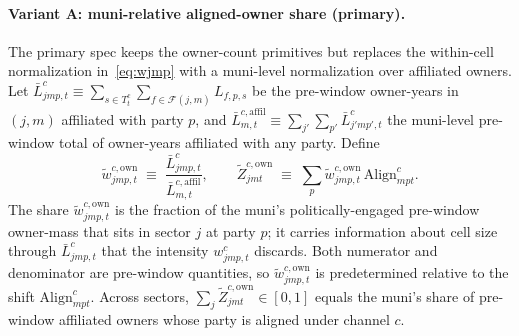 \documentclass{article}
\newcommand{\Align}{\mathrm{Align}}
\newcommand{\cF}{\mathcal{F}}
\theoremstyle{plain}
\theoremstyle{definition}
\theoremstyle{remark}
\begin{document}
\paragraph{Variant A: muni-relative aligned-owner share (primary).}
The primary spec keeps the owner-count primitives but replaces the
within-cell normalization in~\eqref{eq:wjmp} with a muni-level
normalization over affiliated owners. Let
\(
  \bar L^c_{jmp,t}\equiv\sum_{s\in T^{c}_t}
    \sum_{f\in\cF(j,m)} L_{f,p,s}
\)
be the pre-window owner-years in $(j,m)$ affiliated with party $p$, and
\(
  \bar L^{c,\mathrm{affil}}_{m,t}\equiv\sum_{j'}\sum_{p'}\bar L^c_{j'mp',t}
\)
the muni-level pre-window total of owner-years affiliated with any party.
Define
\begin{equation}\label{eq:w-own-rel}
  \tilde w^{c,\mathrm{own}}_{jmp,t}
   \;\equiv\;
   \frac{\bar L^c_{jmp,t}}{\bar L^{c,\mathrm{affil}}_{m,t}},
   \qquad
   \tilde Z^{c,\mathrm{own}}_{jmt}
   \;\equiv\;
   \sum_p \tilde w^{c,\mathrm{own}}_{jmp,t}\,\Align^{c}_{mpt}.
\end{equation}
The share $\tilde w^{c,\mathrm{own}}_{jmp,t}$ is the fraction of the
muni's politically-engaged pre-window owner-mass that sits in sector
$j$ at party $p$; it carries information about cell size through
$\bar L^c_{jmp,t}$ that the intensity $w^{c}_{jmp,t}$ discards.
Both numerator and denominator are pre-window quantities, so
$\tilde w^{c,\mathrm{own}}_{jmp,t}$ is predetermined relative to the shift
$\Align^{c}_{mpt}$. Across sectors, $\sum_j \tilde Z^{c,\mathrm{own}}_{jmt}
\in[0,1]$ equals the muni's share of pre-window affiliated owners whose
party is aligned under channel $c$.
\end{document}
